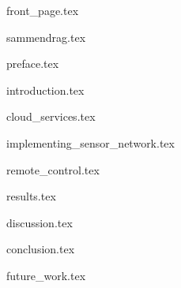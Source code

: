 \documentclass[usenames,dvipsnames, b5paper, twoside, openright]{report}
\begin{document}
%


\setcounter{page}{1}

{front_page.tex}

{sammendrag.tex}


{preface.tex}

\tableofcontents
\newpage



\setcounter{page}{1}

{introduction.tex}

{cloud_services.tex}

{implementing_sensor_network.tex}

{remote_control.tex}

{results.tex}

{discussion.tex}

{conclusion.tex}

{future_work.tex}

\begin{appendices}
\end{appendices}


\newpage


{}
\end{document}
